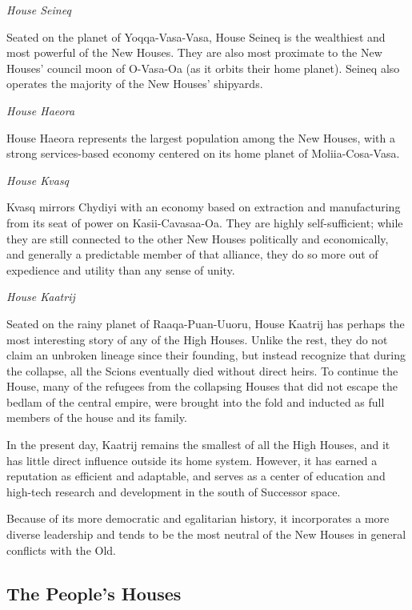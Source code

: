 \documentclass[11pt]{report}
\begin{document}
    \noindent
    \emph{House Seineq}

    Seated on the planet of Yoqqa-Vasa-Vasa, House Seineq is the wealthiest and most powerful of the New Houses. They are also most proximate to the New Houses' council moon of O-Vasa-Oa (as it orbits their home planet). Seineq also operates the majority of the New Houses' shipyards.
    \bigskip

    \noindent
    \emph{House Haeora}

    House Haeora represents the largest population among the New Houses, with a strong services-based economy centered on its home planet of Moliia-Cosa-Vasa.
    \bigskip

    \noindent
    \emph{House Kvasq}

    Kvasq mirrors Chydiyi with an economy based on extraction and manufacturing from its seat of power on Kasii-Cavasaa-Oa. They are highly self-sufficient; while they are still connected to the other New Houses politically and economically, and generally a predictable member of that alliance, they do so more out of expedience and utility than any sense of unity.
    \bigskip

    \noindent
    \emph{House Kaatrij}

    Seated on the rainy planet of Raaqa-Puan-Uuoru, House Kaatrij has perhaps the most interesting story of any of the High Houses. Unlike the rest, they do not claim an unbroken lineage since their founding, but instead recognize that during the collapse, all the Scions eventually died without direct heirs. To continue the House, many of the refugees from the collapsing Houses that did not escape the bedlam of the central empire, were brought into the fold and inducted as full members of the house and its family.

    In the present day, Kaatrij remains the smallest of all the High Houses, and it has little direct influence outside its home system. However, it has earned a reputation as efficient and adaptable, and serves as a center of education and high-tech research and development in the south of Successor space.

    Because of its more democratic and egalitarian history, it incorporates a more diverse leadership and tends to be the most neutral of the New Houses in general conflicts with the Old.
    \bigskip

    \subsection{The People's Houses}
\end{document}
